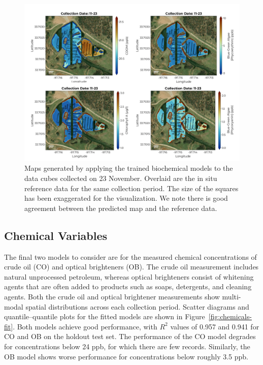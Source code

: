 \documentclass[remotesensing,article,accept,pdftex,moreauthors]{Definitions/mdpi}
\begin{document}
\vspace{-9pt}
\begin{figure}[H]

\vspace{-0.15in}
\hspace{-6pt}\includegraphics[width=0.92\columnwidth]{figures/results/maps/biochemical.pdf}
\vspace{-0.1in}
\caption{Maps generated 
 by applying the trained biochemical models to the data cubes collected on 23 November. Overlaid are the in situ reference data for the same collection period. The size of the squares has been exaggerated for the visualization. We note there is good agreement between the predicted map and the reference data. \label{fig:map-biochem}}
\end{figure}  


 

\subsection{Chemical Variables}

The final two models to consider are for the measured chemical concentrations of crude oil (CO) and optical brighteners (OB). The crude oil measurement includes natural unprocessed petroleum, whereas optical brighteners consist of whitening agents that are often added to products such as soaps, detergents, and cleaning agents. Both the crude oil and optical brightener measurements show multi-modal spatial distributions across each collection period. Scatter diagrams and quantile--quantile plots for the fitted models are shown in Figure~\ref{fig:chemicals-fit}. Both models achieve good performance, with $R^2$ values of 0.957 and 0.941 for CO and OB on the holdout test set. The performance of the CO model degrades for concentrations below 24 ppb, for which there are few records. Similarly, the OB model shows worse performance for concentrations below roughly 3.5 ppb.
\end{document}
